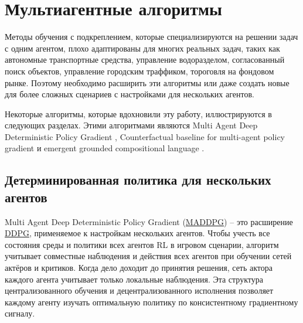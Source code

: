 \section{Мультиагентные алгоритмы} \label{ch2:ma-algs} %

Методы обучения с подкреплением, которые специализируются на решении задач с одним агентом, плохо адаптированы для многих реальных задач, таких как автономные транспортные средства, управление водоразделом, согласованный поиск объектов, управление городским траффиком, тороговля на фондовом рынке. Поэтому необходимо расширить эти алгоритмы или даже создать новые для более сложных сценариев с настройками для нескольких агентов.

Некоторые алгоритмы, которые вдохновили эту работу, иллюстрируются в следующих разделах. Этими алгоритмами являются Multi Agent Deep Deterministic Policy Gradient \cite{lowe2017multiagent}, Counterfactual baseline for multi-agent policy gradient \cite{foerster2017counterfactual} и emergent grounded compositional language \cite{mordatch2017emergence}.

\subsection{Детерминированная политика для нескольких агентов}

Multi Agent Deep Deterministic Policy Gradient (\hyperref[acr:maddpg]{MADDPG}) -- это расширение \hyperref[acr:ddpg]{DDPG}, применяемое к настройкам нескольких агентов. Чтобы учесть все состояния среды и политики всех агентов RL в игровом сценарии, алгоритм учитывает совместные наблюдения и действия всех агентов при обучении сетей актёров и критиков. Когда дело доходит до принятия решения, сеть актора каждого агента учитывает только локальные наблюдения. Эта структура централизованного обучения и децентрализованного исполнения позволяет каждому агенту изучать оптимальную политику по консистентному градиентному сигналу. \cite{lowe2017multiagent}


